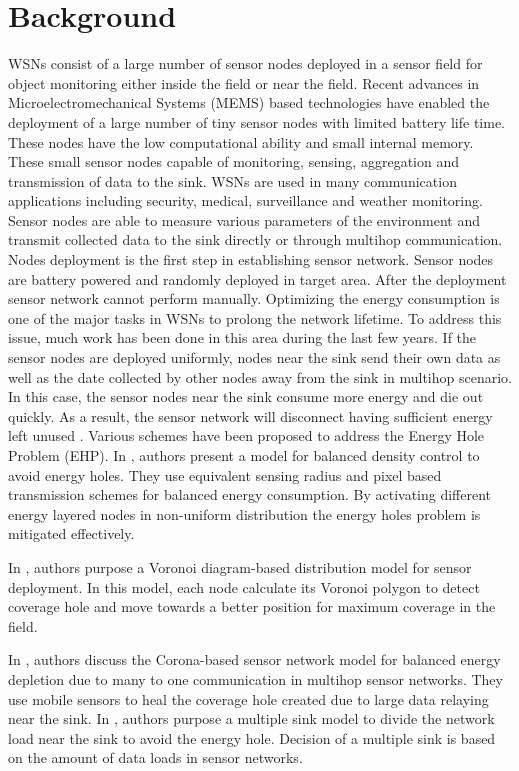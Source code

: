 \documentclass{article}
\begin{document}
\section{Background}
\label{sec:intro}
WSNs consist of a large number of sensor nodes deployed in a sensor field for object monitoring either inside the field or near the field. Recent advances in Microelectromechanical Systems (MEMS) based technologies have enabled the deployment of a large number of tiny sensor nodes with limited battery life time. These nodes have the low computational ability and small internal memory. These small sensor nodes capable of monitoring, sensing, aggregation and transmission of data to the sink. WSNs are used in many communication applications including security, medical, surveillance and weather monitoring.
Sensor nodes are able to measure various parameters of the environment and transmit collected data to the sink directly or through multihop communication.
Nodes deployment is the first step in establishing sensor network. Sensor nodes are battery powered and randomly deployed in target area. After the deployment sensor network cannot perform manually. Optimizing the energy consumption is one of the major tasks in WSNs to prolong the network lifetime. To address this issue, much work has been done in this area during the last few years. If the sensor nodes are deployed uniformly, nodes near the sink send their own data as well as the date collected by other nodes away from the sink in multihop scenario. In this case, the sensor nodes near the sink consume more energy and die out quickly. As a result, the sensor network will disconnect having sufficient energy left unused \cite{1}.
Various schemes have been proposed to address the Energy Hole Problem (EHP). In \cite{1}, authors present a model for balanced density control to avoid energy holes. They use equivalent sensing radius and pixel based transmission schemes for balanced energy consumption. By activating different energy layered nodes in non-uniform distribution the energy holes problem is mitigated effectively.

In \cite{2}, authors purpose a Voronoi diagram-based distribution model for sensor deployment. In this model, each node calculate its Voronoi polygon to detect coverage hole and move towards a better position for maximum coverage in the field.

In \cite{3}, authors discuss the Corona-based sensor network model for balanced energy depletion due to many to one communication in multihop sensor networks. They use mobile sensors to heal the coverage hole created due to large data relaying near the sink. In \cite{4}, authors purpose a multiple sink model to divide the network load near the sink to avoid the energy hole. Decision of a multiple sink is based on the amount of data loads in sensor networks.
\end{document}
